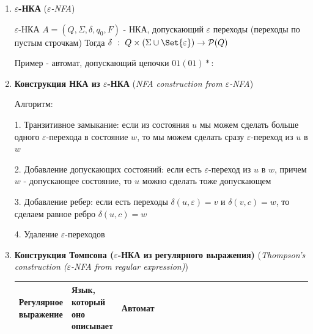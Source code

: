 \documentclass[12pt]{article}
\begin{document}
\begin{enumerate}
        \item \textbf{$\varepsilon$-НКА} (\textit{$\varepsilon$-NFA})

        $\varepsilon$-НКА $A = (Q, \Sigma, \delta, q_0, F)$ - НКА, допускающий $\varepsilon$ переходы (переходы по пустым строчкам)
        Тогда $\delta \ : \ Q \times (\Sigma \union \Set{\varepsilon}) \to \mathcal{P}(Q)$

        Пример - автомат, допускающий цепочки $01(01)*$:


        \item \textbf{Конструкция НКА из $\varepsilon$-НКА} (\textit{NFA construction from $\varepsilon$-NFA})

        Алгоритм:

        1. Транзитивное замыкание: если из состояния $u$ мы можем сделать больше одного $\varepsilon$-перехода в состояние $w$, то мы можем сделать сразу $\varepsilon$-переход из $u$ в $w$

        2. Добавление допускающих состояний: если есть $\varepsilon$-переход из $u$ в $w$, причем $w$ - допускающее состояние, то $u$ можно сделать тоже допускающем

        3. Добавление ребер: если есть переходы $\delta(u, \varepsilon) = v$ и $\delta(v, c) = w$, то сделаем равное ребро $\delta(u, c) = w$

        4. Удаление $\varepsilon$-переходов

        \item \textbf{Конструкция Томпсона ($\varepsilon$-НКА из регулярного выражения)} (\textit{Thompson’s construction ($\varepsilon$-NFA from regular expression)})


        \begin{tabular}{m{0.12\linewidth}|m{0.12\linewidth}|m{0.76\linewidth}}
            Регулярное выражение & Язык, который оно описывает & Автомат \\
            \hline


\end{tabular}
\end{enumerate}
\end{document}
